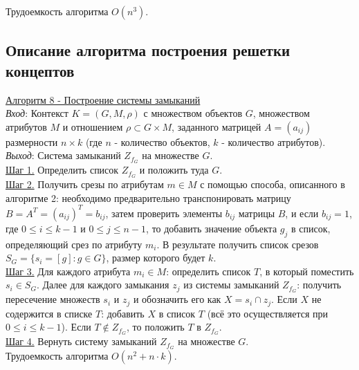 \documentclass[bachelor, och, labwork]{shiza}
\begin{document}
            Трудоемкость алгоритма $O(n^3)$.\\

    \subsection{Описание алгоритма построения решетки концептов}

        \underline{Алгоритм 8 - Построение системы замыканий}\\
            \textit{Вход}: Контекст $K = (G, M, \rho)$ с множеством объектов $G$, множеством атрибутов $M$ и отношением
            $\rho \subset G \times M$, заданного матрицей $A = (a_{ij})$ размерности $n \times k$ (где $n$ - количество
            объектов, $k$ - количество атрибутов). \\
            \textit{Выход}: Система замыканий $Z_{f_G}$ на множестве $G$.\\
            \underline{Шаг 1.} Определить список $Z_{f_G}$ и положить туда $G$. \\
            \underline{Шаг 2.} Получить срезы по атрибутам $m \in M$ с помощью способа, описанного в алгоритме 2:
            необходимо предварительно транспонировать матрицу $B = A^T = (a_{ij})^T = b_{ij}$, затем проверить элементы
            $b_{ij}$ матрицы $B$, и если $b_{ij} = 1$, где $0 \leq i \leq k - 1$ и $0 \leq j \leq n - 1$, то добавить
            значение объекта $g_j$ в список, определяющий срез по атрибуту $m_i$. В результате получить список срезов
            $S_G = \{s_i = [g]: g \in G\}$, размер которого будет $k$. \\
            \underline{Шаг 3.} Для каждого атрибута $m_i \in M$: определить список $T$, в который поместить $s_i \in
            S_G$. Далее для каждого замыкания $z_j$ из системы замыканий $Z_{f_G}$: получить пересечение множеств $s_i$
            и $z_j$ и обозначить его как $X = s_i \cap z_j$. Если $X$ не содержится в списке $T$: добавить $X$ в список
            $T$ (всё это осуществляется при $0 \leq i \leq k - 1$). Если $T \notin Z_{f_G}$, то положить $T$ в
            $Z_{f_G}$.\\
            \underline{Шаг 4.} Вернуть систему замыканий $Z_{f_G}$ на множестве $G$.\\

            Трудоемкость алгоритма $O(n^2 + n \cdot k)$.\\
\end{document}
